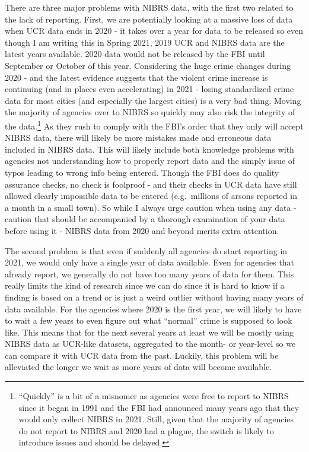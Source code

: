 \documentclass[
]{krantz}
\begin{document}
There are three major problems with NIBRS data, with the
first two related to the lack of reporting. First, we are
potentially looking at a massive loss of data when UCR data
ends in 2020 - it takes over a year for data to be released
so even though I am writing this in Spring 2021, 2019 UCR
and NIBRS data are the latest years available. 2020 data
would not be released by the FBI until September or October
of this year. Considering the huge crime changes during 2020
- and the latest evidence suggests that the violent crime
increase is continuing (and in places even accelerating) in
2021 - losing standardized crime data for most cities (and
especially the largest cities) is a very bad thing. Moving
the majority of agencies over to NIBRS so quickly may also
risk the integrity of the data.\footnote{``Quickly'' is a
  bit of a misnomer as agencies were free to report to NIBRS
  since it began in 1991 and the FBI had announced many
  years ago that they would only collect NIBRS in 2021.
  Still, given that the majority of agencies do not report
  to NIBRS and 2020 had a plague, the switch is likely to
  introduce issues and should be delayed.} As they rush to
comply with the FBI's order that they only will accept NIBRS
data, there will likely be more mistakes made and erroneous
data included in NIBRS data. This will likely include both
knowledge problems with agencies not understanding how to
properly report data and the simply issue of typos leading
to wrong info being entered. Though the FBI does do quality
assurance checks, no check is foolproof - and their checks
in UCR data have still allowed clearly impossible data to be
entered (e.g.~millions of arsons reported in a month in a
small town). So while I always urge caution when using any
data - caution that should be accompanied by a thorough
examination of your data before using it - NIBRS data from
2020 and beyond merits extra attention.

The second problem is that even if suddenly all agencies do
start reporting in 2021, we would only have a single year of
data available. Even for agencies that already report, we
generally do not have too many years of data for them. This
really limits the kind of research since we can do since it
is hard to know if a finding is based on a trend or is just
a weird outlier without having many years of data available.
For the agencies where 2020 is the first year, we will
likely to have to wait a few years to even figure out what
``normal'' crime is supposed to look like. This means that
for the next several years at least we will be mostly using
NIBRS data as UCR-like datasets, aggregated to the month- or
year-level so we can compare it with UCR data from the past.
Luckily, this problem will be alleviated the longer we wait
as more years of data will become available.
\end{document}
